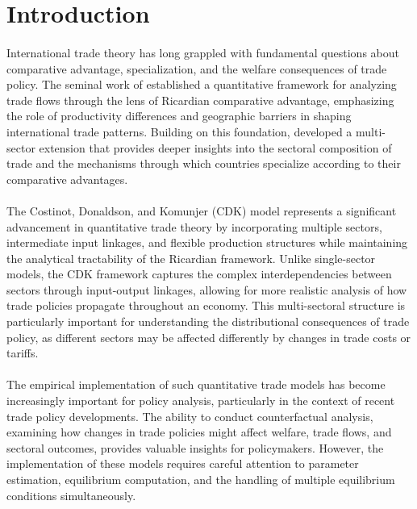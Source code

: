 \section{Introduction}

\paragraph{} International trade theory has long grappled with fundamental questions about comparative advantage, specialization, and the welfare consequences of trade policy. The seminal work of \cite{eaton2002Econometrica} established a quantitative framework for analyzing trade flows through the lens of Ricardian comparative advantage, emphasizing the role of productivity differences and geographic barriers in shaping international trade patterns. Building on this foundation, \cite{costinot2012TheReviewofEconomicStudies} developed a multi-sector extension that provides deeper insights into the sectoral composition of trade and the mechanisms through which countries specialize according to their comparative advantages.

\paragraph{} The Costinot, Donaldson, and Komunjer (CDK) model represents a significant advancement in quantitative trade theory by incorporating multiple sectors, intermediate input linkages, and flexible production structures while maintaining the analytical tractability of the Ricardian framework. Unlike single-sector models, the CDK framework captures the complex interdependencies between sectors through input-output linkages, allowing for more realistic analysis of how trade policies propagate throughout an economy. This multi-sectoral structure is particularly important for understanding the distributional consequences of trade policy, as different sectors may be affected differently by changes in trade costs or tariffs.

\paragraph{} The empirical implementation of such quantitative trade models has become increasingly important for policy analysis, particularly in the context of recent trade policy developments. The ability to conduct counterfactual analysis, examining how changes in trade policies might affect welfare, trade flows, and sectoral outcomes, provides valuable insights for policymakers. However, the implementation of these models requires careful attention to parameter estimation, equilibrium computation, and the handling of multiple equilibrium conditions simultaneously.

